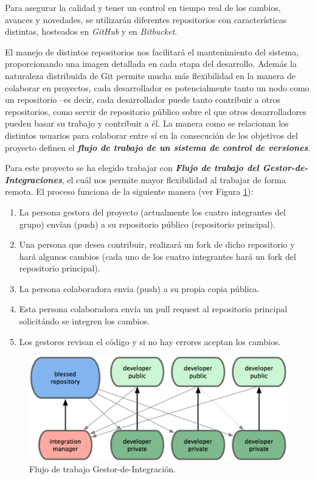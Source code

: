 Para asegurar la calidad y tener un control en tiempo real de los cambios, avances y novedades, se utilizarán diferentes repositorios con características distintas, hosteados en \textit{GitHub} y en \textit{Bitbucket}.
{\correccionTexto
El manejo de distintos repositorios nos facilitará el mantenimiento del sistema, proporcionando una imagen detallada en cada etapa del desarrollo. 
Además la naturaleza distribuida de Git permite mucha más flexibilidad en la manera de colaborar en proyectos, cada desarrollador es potencialmente tanto un nodo como un repositorio --es decir, cada desarrollador puede tanto contribuir a otros repositorios, como servir de repositorio público sobre el que otros desarrolladores pueden basar su trabajo y contribuir a él. La manera como se relacionan los distintos usuarios para colaborar entre sí en la consecución de los objetivos del proyecto definen el \textit{\textbf{flujo de trabajo de un sistema de control de versiones}}.
  
Para este proyecto se ha elegido trabajar con \textbf{\textit{Flujo de trabajo del Gestor-de-Integraciones}}, el cuál nos permite mayor flexibilidad al trabajar de forma remota.  El proceso funciona de la siguiente manera (ver Figura \ref{git_integracion}):
	\begin{enumerate}
		\item    La persona gestora del proyecto (actualmente los cuatro integrantes del grupo) envían (push) a su repositorio público (repositorio principal).
		\item    Una persona que desea contribuir, realizará un fork de dicho repositorio y hará algunos cambios (cada uno de los cuatro integrantes hará un fork del repositorio principal).
		\item    La persona colaboradora envia (push) a su propia copia pública.
		\item    Esta persona colaboradora envía un pull request al repositorio principal solicitándo se integren los cambios.
		\item    Los gestores revisan el código y si no hay errores aceptan los cambios.
	\end{enumerate}
\begin{figure}
  \centering
  \includegraphics[width=.8\textwidth]{img/tp2_definicion/git_integracion}
  \caption{Flujo de trabajo Gestor-de-Integración.}
  \label{git_integracion}
\end{figure}
}
